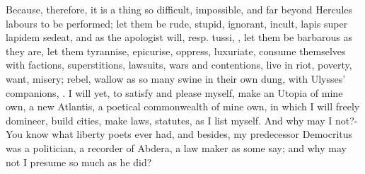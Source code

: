 {Because, therefore, it is a thing so difficult, impossible, and far
beyond Hercules labours to be performed; let them be rude, stupid,
ignorant, incult, lapis super lapidem sedeat, and as the apologist
will, resp. tussi, , let them be
barbarous as they are, let them tyrannise, epicurise, oppress,
luxuriate, consume themselves with factions, superstitions, lawsuits,
wars and contentions, live in riot, poverty, want, misery; rebel,
wallow as so many swine in their own dung, with Ulysses' companions,
. I will yet, to satisfy and please myself,
make an Utopia of mine own, a new Atlantis, a poetical commonwealth of
mine own, in which I will freely domineer, build cities, make laws,
statutes, as I list myself. And why may I not?- You know what liberty poets ever had, and besides, my
predecessor Democritus was a politician, a recorder of Abdera, a law
maker as some say; and why may not I presume so much as he did?

}
